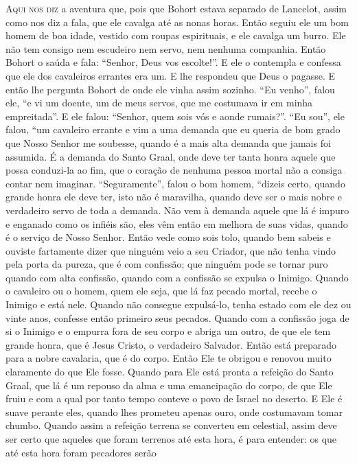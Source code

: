 \textsc{Aqui nos diz} a aventura que, pois que Bohort estava separado de Lancelot, assim
como nos diz a fala, que ele cavalga até as nonas horas. Então seguiu
ele um bom homem de boa idade, vestido com roupas espirituais, e ele cavalga um
burro. Ele não tem consigo nem escudeiro nem servo, nem nenhuma companhia.
Então Bohort o saúda e fala: “Senhor, Deus vos escolte!”. E ele o contempla e
confessa que ele dos cavaleiros errantes era um. E lhe respondeu que Deus o
pagasse. E então lhe pergunta Bohort de onde ele vinha assim sozinho. “Eu
venho”, falou ele, “e vi um doente, um de meus servos, que me costumava ir em
minha empreitada”. E ele falou: “Senhor, quem sois vós e aonde rumais?”. “Eu
sou”, ele falou, “um cavaleiro errante e vim a uma demanda que eu queria de bom
grado que Nosso Senhor me soubesse, quando é a mais alta demanda que jamais foi
assumida. É a demanda do Santo Graal, onde deve ter tanta honra aquele que
possa conduzi-la ao fim, que o coração de nenhuma pessoa mortal não a consiga
contar nem imaginar. “Seguramente”, falou o bom homem, “dizeis certo, quando
grande honra ele deve ter, isto não é maravilha, quando deve ser o mais nobre e
verdadeiro servo de toda a demanda. Não vem à demanda aquele que lá é
impuro e enganado como os infiéis são, eles vêm então em melhora de suas vidas,
quando é o serviço de Nosso Senhor. Então vede como sois tolo, quando bem
sabeis e ouviste fartamente dizer que ninguém veio a seu Criador, que não tenha
vindo pela porta da pureza, que é com confissão; que ninguém pode se tornar
puro quando com alta confissão, quando com a confissão se expulsa o Inimigo.
Quando o cavaleiro ou o homem, quem ele seja, que lá faz pecado mortal, recebe
o Inimigo e está nele. Quando não consegue expulsá-lo, tenha estado com ele dez
ou vinte anos, confesse então primeiro seus pecados. Quando com a confissão
joga de si o Inimigo e o empurra fora de seu corpo e abriga um outro, de que
ele tem grande honra, que é Jesus Cristo, o verdadeiro Salvador. Então está
preparado para a nobre cavalaria, que é do corpo. Então Ele te
obrigou e renovou muito claramente do que Ele fosse. Quando para Ele está
pronta a refeição do Santo Graal, que lá é um repouso da alma e uma emancipação
do corpo, de que Ele fruiu e com a qual por tanto tempo conteve o povo de
Israel no deserto. E Ele é suave perante eles, quando lhes prometeu apenas
ouro, onde costumavam tomar chumbo. Quando assim a refeição terrena se
converteu em celestial, assim deve ser certo que aqueles que foram terrenos até
esta hora, é para entender: os que até esta hora foram pecadores serão
